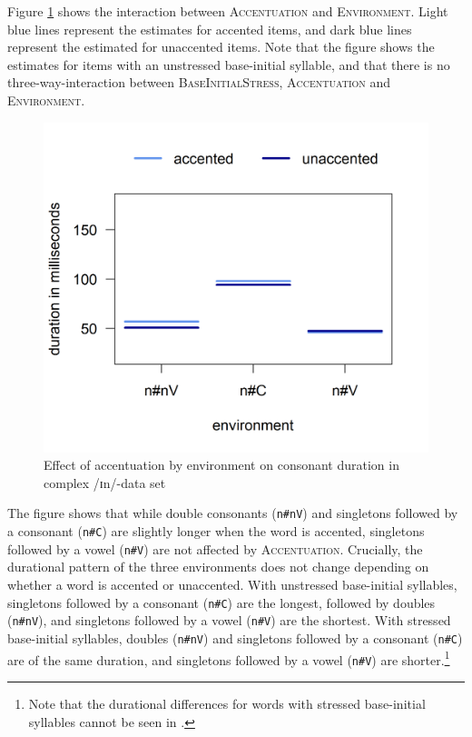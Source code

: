  	
 

Figure \ref{fig:Env Acc In experiment} shows the interaction between \textsc{Accentuation} and \textsc{Environment}. Light blue lines represent the estimates for accented items, and dark blue lines represent the estimated for unaccented items. Note that the figure shows the estimates for items with an unstressed base-initial syllable, and that there is no three-way-interaction between \textsc{BaseInitialStress}, \textsc{Accentuation} and \textsc{Environment}. 


	


	\begin{figure}[h!]
		\centering
		\includegraphics [scale=0.5] {images/Experiment/InModelInterEnvAcc}
		\caption{Effect of accentuation by environment on consonant duration in complex /ɪn/-data set}
		\label{fig:Env Acc In experiment}
	\end{figure}






The figure shows that while double consonants (\texttt{n\#nV}) and singletons followed by a consonant (\texttt{n\#C}) are slightly longer when the word is accented, singletons followed by a vowel (\texttt{n\#V}) are not affected by \textsc{Accentuation}. Crucially, 
the durational pattern of the three environments does not change depending on whether a word is accented or unaccented. 
With unstressed base-initial syllables, singletons followed by a consonant (\texttt{n\#C}) are the longest, followed by doubles (\texttt{n\#nV}), and singletons followed by a vowel (\texttt{n\#V}) are the shortest.
With stressed base-initial syllables, doubles (\texttt{n\#nV}) and singletons followed by a consonant (\texttt{n\#C}) are of the same duration, and singletons followed by a vowel (\texttt{n\#V}) are shorter.\footnote{Note that the durational differences for words with stressed base-initial syllables cannot be seen in .}


